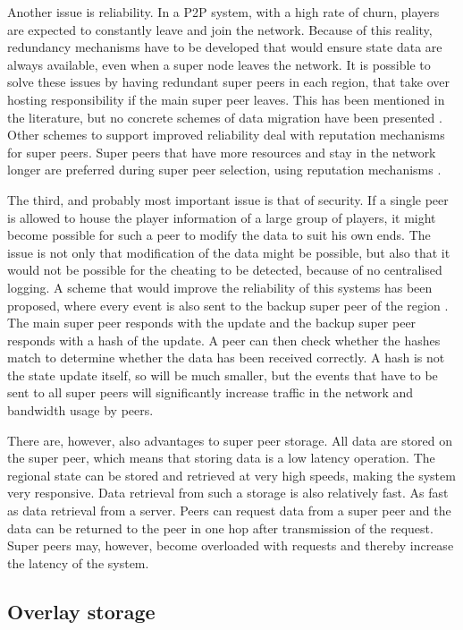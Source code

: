 \documentclass[journal,oneside,a4paper,onecolumn]{IEEEtran}
\begin{document}
Another issue is reliability. In a P2P system, with a high rate of churn, players are expected to constantly leave and join the network. Because of this reality, redundancy mechanisms have to be developed that would ensure state data are always available, even when a super node leaves the network. It is possible to solve these issues by having redundant super peers in each region, that take over hosting responsibility if the main super peer leaves. This has been mentioned in the literature, but no concrete schemes of data migration have been presented \cite{}. Other schemes to support improved reliability deal with reputation mechanisms for super peers. Super peers that have more resources and stay in the network longer are preferred during super peer selection, using reputation mechanisms \cite{fan_mediator_paper}.

The third, and probably most important issue is that of security. If a single peer is allowed to house the player information of a large group of players, it might become possible for such a peer to modify the data to suit his own ends. The issue is not only that modification of the data might be possible, but also that it would not be possible for the cheating to be detected, because of no centralised logging. A scheme that would improve the reliability of this systems has been proposed, where every event is also sent to the backup super peer of the region \cite{past_storage_focus}. The main super peer responds with the update and the backup super peer responds with a hash of the update. A peer can then check whether the hashes match to determine whether the data has been received correctly. A hash is not the state update itself, so will be much smaller, but the events that have to be sent to all super peers will significantly increase traffic in the network and bandwidth usage by peers.

There are, however, also advantages to super peer storage. All data are stored on the super peer, which means that storing data is a low latency operation. The regional state can be stored and retrieved at very high speeds, making the system very responsive. Data retrieval from such a storage is also relatively fast. As fast as data retrieval from a server. Peers can request data from a super peer and the data can be returned to the peer in one hop after transmission of the request. Super peers may, however, become overloaded with requests and thereby increase the latency of the system.

\subsection{Overlay storage}
\end{document}
